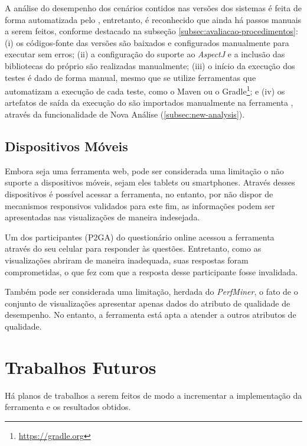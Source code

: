 A análise do desempenho dos cenários contidos nas versões dos sistemas é feita de forma automatizada pelo \textit{\perfMinerName}, entretanto, é reconhecido que ainda há passos manuais a serem feitos, conforme destacado na subseção \ref{subsec:avaliacao-procedimentos}: (i) os códigos-fonte das versões são baixados e configurados manualmente para executar sem erros; (ii) a configuração do suporte ao \textit{AspectJ} e a inclusão das bibliotecas do próprio \textit{\perfMinerName} são realizadas manualmente; (iii) o início da execução dos testes é dado de forma manual, mesmo que se utilize ferramentas que automatizam a execução de cada teste, como o Maven ou o Gradle\footnote{\href{https://gradle.org}{https://gradle.org}}; e (iv) os artefatos de saída da execução do \textit{\perfMinerName} são importados manualmente na ferramenta \textit{\toolName}, através da funcionalidade de Nova Análise (\ref{subsec:new-analysis}).

\subsection{Dispositivos Móveis}

Embora seja uma ferramenta web, pode ser considerada uma limitação o não suporte a dispositivos móveis, sejam eles tablets ou smartphones. Através desses dispositivos é possível acessar a ferramenta, no entanto, por não dispor de mecanismos responsivos validados para este fim, as informações podem ser apresentadas nas visualizações de maneira indesejada.

Um dos participantes (P2GA) do questionário online acessou a ferramenta através do seu celular para responder às questões. Entretanto, como as visualizações abriram de maneira inadequada, suas respostas foram comprometidas, o que fez com que a resposta desse participante fosse invalidada.

Também pode ser considerada uma limitação, herdada do \textit{PerfMiner}, o fato de o conjunto de visualizações apresentar apenas dados do atributo de qualidade de  desempenho. No entanto, a ferramenta está apta a atender a outros atributos de qualidade.

\section{Trabalhos Futuros} \label{sec:consideracoes-trabalhos-futuros}

Há planos de trabalhos a serem feitos de modo a incrementar a implementação da ferramenta e os resultados obtidos.

